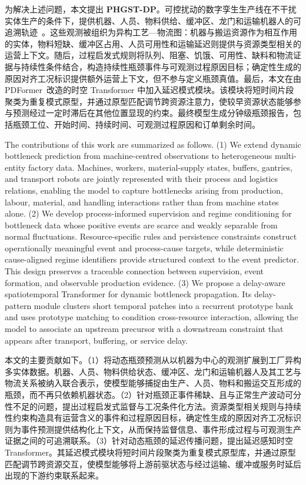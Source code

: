 \documentclass[a4paper,fleqn]{cas-dc}
\newcommand{\zhpara}[1]{%
  \par\begingroup\small\color{black!72}\noindent #1\par\endgroup}
\begin{document}
\zhpara{为解决上述问题，本文提出 \textbf{PHGST-DP}。可控扰动的数字孪生生产线在不干扰实体生产的条件下，提供机器、人员、物料供给、缓冲区、龙门和运输机器人的可追溯轨迹~\cite{lu2020digital,isaacsim2026,xue2026safe}。这些观测被组织为异构工艺—物流图：机器与搬运资源作为相互作用的实体，物料短缺、缓冲区占用、人员可用性和运输延迟则提供与资源类型相关的运营上下文。随后，过程启发式规则将队列、阻塞、饥饿、可用性、缺料和物流证据与持续性条件结合，构造持续性瓶颈事件与可观测过程原因目标；确定性生成的原因对齐工况标识提供额外运营上下文，但不参与定义瓶颈真值。最后，本文在由 PDFormer~\cite{jiang2023pdformer}改造的时空 Transformer 中加入延迟模式模块。该模块将短时间片段聚类为重复模式原型，并通过原型匹配调节跨资源注意力，使较早资源状态能够参与预测经过一定时滞后在其他位置显现的约束。最终模型生成分钟级瓶颈报告，包括瓶颈工位、开始时间、持续时间、可观测过程原因和订单剩余时间。}

The contributions of this work are summarized as follows. (1) We extend dynamic bottleneck prediction from machine-centred observations to heterogeneous multi-entity factory data. Machines, workers, material-supply states, buffers, gantries, and transport robots are jointly represented with their process and logistics relations, enabling the model to capture bottlenecks arising from production, labour, material, and handling interactions rather than from machine states alone. (2) We develop process-informed supervision and regime conditioning for bottleneck data whose positive events are scarce and weakly separable from normal fluctuations. Resource-specific rules and persistence constraints construct operationally meaningful event and process-cause targets, while deterministic cause-aligned regime identifiers provide structured context to the event predictor. This design preserves a traceable connection between supervision, event formation, and observable production evidence. (3) We propose a delay-aware spatiotemporal Transformer for dynamic bottleneck propagation. Its delay-pattern module clusters short temporal patches into a recurrent prototype bank and uses prototype matching to condition cross-resource interaction, allowing the model to associate an upstream precursor with a downstream constraint that appears after transport, buffering, or service delay.

\zhpara{本文的主要贡献如下。（1）将动态瓶颈预测从以机器为中心的观测扩展到工厂异构多实体数据。机器、人员、物料供给状态、缓冲区、龙门和运输机器人及其工艺与物流关系被纳入联合表示，使模型能够捕捉由生产、人员、物料和搬运交互形成的瓶颈，而不再只依赖机器状态。（2）针对瓶颈正事件稀缺、且与正常生产波动可分性不足的问题，提出过程启发式监督与工况条件化方法。资源类型相关规则与持续性约束构造具有运营含义的事件和过程原因目标，确定性生成的原因对齐工况标识则为事件预测提供结构化上下文，从而保持监督信息、事件形成过程与可观测生产证据之间的可追溯联系。（3）针对动态瓶颈的延迟传播问题，提出延迟感知时空 Transformer。其延迟模式模块将短时间片段聚类为重复模式原型库，并通过原型匹配调节跨资源交互，使模型能够将上游前驱状态与经过运输、缓冲或服务时延后出现的下游约束联系起来。}
\end{document}
